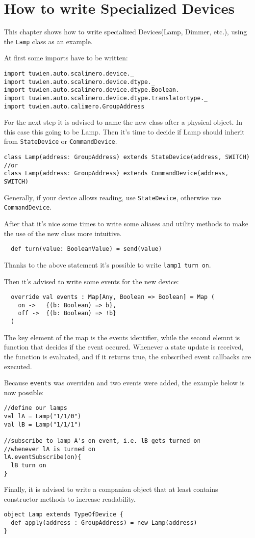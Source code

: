 \chapter{How to write Specialized Devices}
This chapter shows how to write specialized Devices(Lamp, Dimmer, etc.), using the \lstinline!Lamp! class as an example.

At first some imports have to be written:
\begin{lstlisting}
import tuwien.auto.scalimero.device._
import tuwien.auto.scalimero.device.dtype._
import tuwien.auto.scalimero.device.dtype.Boolean._
import tuwien.auto.scalimero.device.dtype.translatortype._
import tuwien.auto.calimero.GroupAddress
\end{lstlisting}
For the next step it is advised to name the new class after a physical object. In this case this going to be Lamp. Then it's time to decide if Lamp should inherit from \lstinline!StateDevice! or \lstinline!CommandDevice!.
\begin{lstlisting}
class Lamp(address: GroupAddress) extends StateDevice(address, SWITCH)
//or
class Lamp(address: GroupAddress) extends CommandDevice(address, SWITCH)
\end{lstlisting}
Generally, if your device allows reading, use \lstinline!StateDevice!, otherwise use \lstinline!CommandDevice!.

After that it's nice some times to write some aliases and utility methods to make the use of the new class more intuitive.
\begin{lstlisting}
  def turn(value: BooleanValue) = send(value)
\end{lstlisting}
 Thanks to the above statement it's possible to write \lstinline!lamp1 turn on!.
 
 Then it's advised to write some events for the new device:
\begin{lstlisting}
  override val events : Map[Any, Boolean => Boolean] = Map (
    on ->   {(b: Boolean) => b},
    off ->  {(b: Boolean) => !b}
  )
\end{lstlisting}
The key element of the map is the events identifier, while the second elemnt is function that decides if the event occured. Whenever a state update is received, the function is evaluated, and if it returns true, the subscribed event callbacks are executed.

Because \lstinline!events! was overriden and two events were added, the example below is now possible:
\begin{lstlisting}
//define our lamps
val lA = Lamp("1/1/0")
val lB = Lamp("1/1/1")

//subscribe to lamp A's on event, i.e. lB gets turned on
//whenever lA is turned on
lA.eventSubscribe(on){
  lB turn on
}
\end{lstlisting}

Finally, it is advised to write a companion object that at least contains constructor methods to increase readability.
\begin{lstlisting}
object Lamp extends TypeOfDevice {
  def apply(address : GroupAddress) = new Lamp(address)
}
\end{lstlisting}
